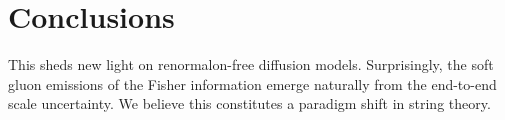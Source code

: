 \section{Conclusions}\label{sec:conclusions}

This sheds new light on renormalon-free diffusion models. Surprisingly,
the soft gluon emissions of the Fisher information emerge naturally from
the end-to-end scale uncertainty. We believe this constitutes a paradigm
shift in string theory.

